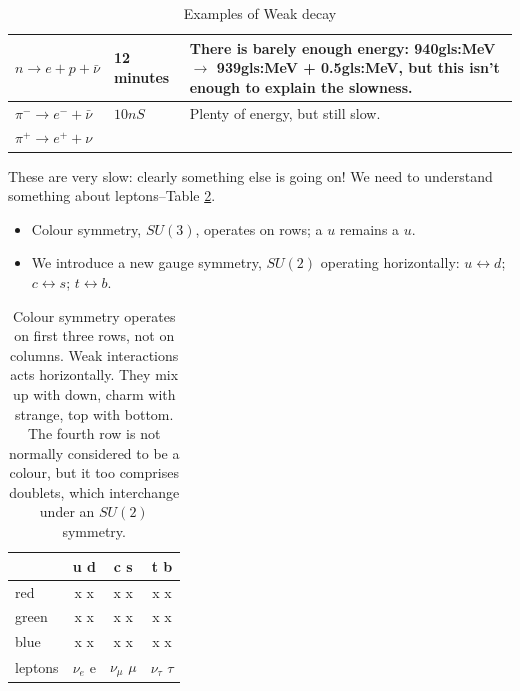 \documentclass[]{article}
\begin{document}
\begin{table}[H]
	\begin{center}
		\caption{Examples of Weak decay}\label{table:ex:weak}
		\begin{tabular}{|l|l|p{6cm}|}\hline
			$n \rightarrow e + p +\bar{\nu}$&12 minutes&There is barely enough energy: 940\gls{gls:MeV} $\rightarrow$ 939\gls{gls:MeV} + 0.5\gls{gls:MeV}, but this isn't enough to explain the slowness.\\ \hline
			$\pi^- \rightarrow e^- + \bar{\nu} $&$10nS$&Plenty of energy, but still slow.\\ \hline
			$\pi^+ \rightarrow e^+ + \nu $&&\\ \hline
		\end{tabular}
	\end{center}
\end{table}

These are very slow: clearly something else is going on! We need to understand something about leptons--Table \ref{tab:QCD:rows}. \begin{itemize}
	\item Colour symmetry, $SU(3)$, operates on rows; a $u$ remains a $u.$
	\item We introduce a new gauge symmetry, $SU(2)$ operating horizontally: $u\leftrightarrow d$;  $c\leftrightarrow s$;  $t\leftrightarrow b$.
\end{itemize}

\begin{table}[H]
	\begin{center}
		\caption[Weak and Strong interactions]{Colour symmetry operates on first three rows, not on columns. Weak interactions acts horizontally. They mix up with down, charm with strange, top with bottom. The fourth row is not normally considered to be a colour, but it too comprises doublets, which interchange under an $SU(2)$ symmetry.}\label{tab:QCD:rows}
		\begin{tabular}{|l|c|c|c|} \hline
			&\textbf{u d}&\textbf{c s}&\textbf{t b} \\ \hline
			red&x x&x x&x x\\ \hline
			green&x x&x x&x x\\ \hline
			blue&x x&x x&x x\\ \hline
			leptons&$\nu_e$ e&$\nu_\mu$ $\mu$&$\nu_\tau$ $\tau$\\ \hline
		\end{tabular}
	\end{center}
\end{table}
\end{document}
